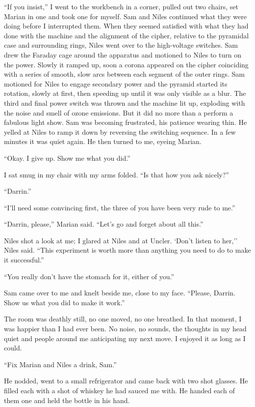 ``If you insist,'' I went to the workbench in a corner, pulled out two
chairs, set Marian in one and took one for myself. Sam and Niles
continued what they were doing before I interrupted them. When they
seemed satisfied with what they had done with the machine and the
alignment of the cipher, relative to the pyramidal case and surrounding
rings, Niles went over to the high-voltage switches. Sam drew the
Faraday cage around the apparatus and motioned to Niles to turn on the
power. Slowly it ramped up, soon a corona appeared on the cipher
coinciding with a series of smooth, slow arcs between each segment of
the outer rings. Sam motioned for Niles to engage secondary power and
the pyramid started its rotation, slowly at first, then speeding up
until it was only visible as a blur. The third and final power switch
was thrown and the machine lit up, exploding with the noise and smell of
ozone emissions. But it did no more than a perform a fabulous light
show. Sam was becoming frustrated, his patience wearing thin. He yelled
at Niles to ramp it down by reversing the switching sequence. In a few
minutes it was quiet again. He then turned to me, eyeing Marian.

``Okay. I give up. Show me what you did.''

I sat smug in my chair with my arms folded. ``Is that how you ask
nicely?''

``Darrin.''

``I'll need some convincing first, the three of you have been very rude
to me.''

``Darrin, please,'' Marian said. ``Let's go and forget about all this.''

Niles shot a look at me; I glared at Niles and at Uncler. `Don't listen
to her,'' Niles said. ``This experiment is worth more than anything you
need to do to make it successful.''

``You really don't have the stomach for it, either of you.''

Sam came over to me and knelt beside me, close to my face. ``Please,
Darrin. Show us what you did to make it work.''

The room was deathly still, no one moved, no one breathed. In that
moment, I was happier than I had ever been. No noise, no sounds, the
thoughts in my head quiet and people around me anticipating my next
move. I enjoyed it as long as I could.

``Fix Marian and Niles a drink, Sam.''

He nodded, went to a small refrigerator and came back with two shot
glasses. He filled each with a shot of whiskey he had sauced me with. He
handed each of them one and held the bottle in his hand.


